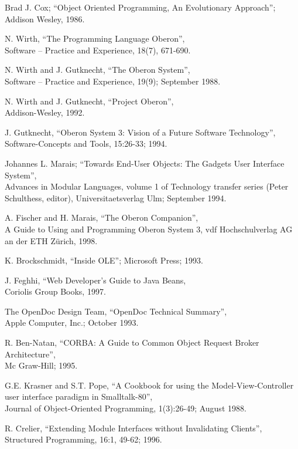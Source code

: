 \begin{thebibliography}{9}
Brad J. Cox; ``Object Oriented Programming, An Evolutionary Approach'';
Addison Wesley, 1986.

N. Wirth, ``The Programming Language Oberon'',\\
Software -- Practice and Experience, 18(7), 671-690.

N. Wirth and J. Gutknecht, ``The Oberon System'',\\
Software -- Practice and Experience, 19(9); September 1988.

N. Wirth and J. Gutknecht, ``Project Oberon'',\\
Addison-Wesley, 1992.

J. Gutknecht, ``Oberon System 3: Vision of a Future Software Technology'',\\
Software-Concepts and Tools, 15:26-33; 1994.

Johannes L. Marais; ``Towards End-User Objects: The Gadgets User Interface
System'',\\
Advances in Modular Languages, volume 1 of Technology transfer series (Peter
Schulthess, editor), Universitaetsverlag Ulm; September 1994.

A. Fischer and H. Marais, ``The Oberon Companion'',\\
A Guide to Using and Programming Oberon System 3,
vdf Hochschulverlag AG an der ETH Z\"urich, 1998.

K. Brockschmidt, ``Inside OLE''; Microsoft Press; 1993.

J. Feghhi, ``Web Developer's Guide to Java Beans,\\
Coriolis Group Books, 1997.

The OpenDoc Design Team, ``OpenDoc Technical Summary'',\\
Apple Computer, Inc.; October 1993.

R. Ben-Natan, ``CORBA: A Guide to Common Object Request Broker
Architecture'',\\
Mc Graw-Hill; 1995.

G.E. Krasner and S.T. Pope, ``A Cookbook for using the Model-View-Controller
user interface paradigm in Smalltalk-80'',\\
Journal of Object-Oriented Programming, 1(3):26-49; August 1988.

 R. Crelier, ``Extending Module Interfaces without Invalidating  Clients'',\\
Structured Programming, 16:1, 49-62; 1996.


\end{thebibliography}
